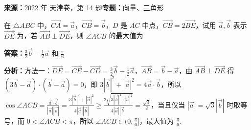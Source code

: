 \begin{question}[points=5]
\textbf{来源：}2022 年 天津卷，第 14 题\quad \textbf{专题：}向量、三角形\par
在 $\triangle ABC$ 中，$\overrightarrow{CA}=\vec{a}$，$\overrightarrow{CB}=\vec{b}$，$D$ 是 $AC$ 中点，$\overrightarrow{CB}=2\overrightarrow{BE}$，试用 $\vec{a},\vec{b}$ 表示 $\overrightarrow{DE}$ 为，若 $\overrightarrow{AB}\perp\overrightarrow{DE}$，则 $\angle ACB$ 的最大值为
\begin{solution}
\textbf{答案：}$\frac{3}{2}\vec{b}-\frac{1}{2}\vec{a}$ 和 $\frac{\pi}{6}$

\textbf{分析：}方法一：$\overrightarrow{DE}=\overrightarrow{CE}-\overrightarrow{CD}=\frac{3}{2}\vec{b}-\frac{1}{2}\vec{a}$，$\overrightarrow{AB}=\vec{b}-\vec{a}$，由 $\overrightarrow{AB}\perp\overrightarrow{DE}$ 得 $(3\vec{b}-\vec{a})\cdot(\vec{b}-\vec{a})=0$，即 $3|\vec{b}|^2+|\vec{a}|^2=4\vec{a}\cdot\vec{b}$，所以 $\cos\angle ACB=\frac{\vec{a}\cdot\vec{b}}{|\vec{a}||\vec{b}|}=\frac{3|\vec{b}|^2+|\vec{a}|^2}{4|\vec{a}||\vec{b}|}\ge\frac{2\sqrt{3|\vec{b}|^2\cdot|\vec{a}|^2}}{4|\vec{a}||\vec{b}|}=\frac{\sqrt{3}}{2}$，当且仅当 $|\vec{a}|=\sqrt{3}|\vec{b}|$ 时取等号，而 $0<\angle ACB<\pi$，所以 $\angle ACB\in(0,\frac{\pi}{6}]$，最大值为 $\frac{\pi}{6}$.
\end{solution}
\end{question}

